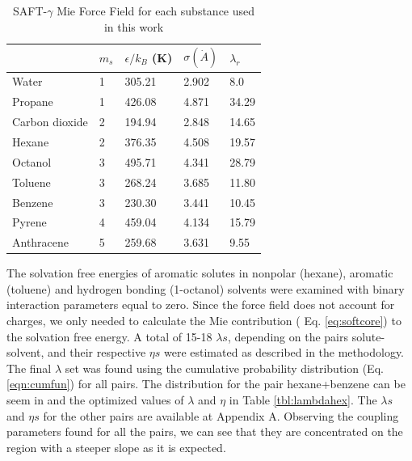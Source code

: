 \begin{table}[h]
\centering
  \caption{SAFT-$\gamma$ Mie Force Field for each substance used in this work}
  \label{tbl:parameters}
  \begin{tabular}{lllll}
      \hline
                     & $m_s$ & $\epsilon/k_{B}$ (K) & $\sigma (\dot{A})$ & $\lambda_r$ \\ \hline
      Water          & 1     & 305.21               & 2.902              & 8.0         \\
      Propane        & 1     & 426.08               & 4.871              & 34.29       \\
      Carbon dioxide & 2     & 194.94               & 2.848              & 14.65       \\
      Hexane         & 2     & 376.35               & 4.508              & 19.57       \\
      Octanol        & 3     & 495.71               & 4.341              & 28.79       \\
      Toluene        & 3     & 268.24               & 3.685              & 11.80       \\
      Benzene        & 3     & 230.30               & 3.441              & 10.45       \\
      Pyrene         & 4     & 459.04               & 4.134              & 15.79       \\
      Anthracene     & 5     & 259.68               & 3.631              & 9.55        \\ \hline
  \end{tabular}

\end{table}
\FloatBarrier
The solvation free energies of aromatic solutes in nonpolar (hexane), aromatic (toluene) and hydrogen bonding (1-octanol) solvents were examined with binary interaction parameters equal to zero. Since the force field does not account for charges, we only needed to calculate the Mie contribution ( Eq. \eqref{eq:softcore}) to the solvation free energy. A total of 15-18 $\lambda s$, depending on the pairs solute-solvent,   and their respective $\eta s$ were estimated as described in the methodology. The final $\lambda$ set was found using  the cumulative probability distribution (Eq. \eqref{eqn:cumfun}) for all pairs. The distribution for the pair hexane+benzene can be seem in  and the optimized values of $\lambda$ and $\eta$ in Table \ref{tbl:lambdahex}. The $\lambda s$ and $\eta s$  for the other pairs are available at  Appendix A. Observing the coupling parameters found for all the pairs, we can see that they are concentrated on the region with a steeper slope as it is expected.

